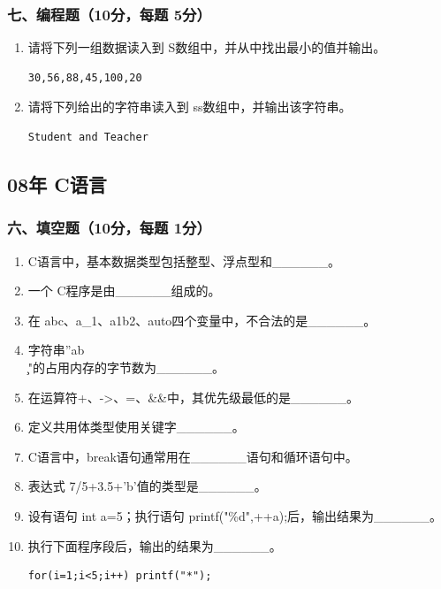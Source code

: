 \documentclass[12pt,a4paper]{article}
\begin{document}
\subsubsection*{七、编程题（10分，每题 5分）}
\begin{enumerate}
    \item 请将下列一组数据读入到 S数组中，并从中找出最小的值并输出。
    \begin{verbatim}
30,56,88,45,100,20
    \end{verbatim}
    \item 请将下列给出的字符串读入到 ss数组中，并输出该字符串。
    \begin{verbatim}
Student and Teacher
    \end{verbatim}
\end{enumerate}

\subsection*{08年 C语言}
\subsubsection*{六、填空题（10分，每题 1分）}
\begin{enumerate}
    \item C语言中，基本数据类型包括整型、浮点型和\_\_\_\_\_\_。
    \item 一个 C程序是由\_\_\_\_\_\_组成的。
    \item 在 abc、a\_1、a1b2、auto四个变量中，不合法的是\_\_\_\_\_\_。
    \item 字符串”ab\\\c\n{}"的占用内存的字节数为\_\_\_\_\_\_。
    \item 在运算符+、->、\*=、\&\&中，其优先级最低的是\_\_\_\_\_\_。
    \item 定义共用体类型使用关键字\_\_\_\_\_\_。
    \item C语言中，break语句通常用在\_\_\_\_\_\_语句和循环语句中。
    \item 表达式 7/5+3.5+'b'值的类型是\_\_\_\_\_\_。
    \item 设有语句 int a=5；执行语句 printf("\%d",++a);后，输出结果为\_\_\_\_\_\_。
    \item 执行下面程序段后，输出的结果为\_\_\_\_\_\_。
    \begin{verbatim}
for(i=1;i<5;i++) printf("*");
    \end{verbatim}
\end{enumerate}
\end{document}
